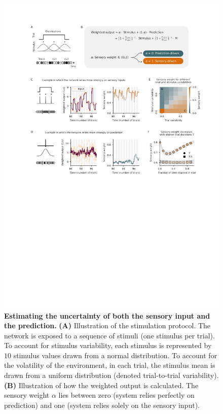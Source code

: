 \documentclass[10pt,a4paper]{article}
\begin{document}
\begin{figure}[t!]
	\centering
    \includegraphics[width=1\linewidth]{../results/figures/final/Fig_3}
\caption{\footnotesize{\bf Estimating the uncertainty of both the sensory input and the prediction.\newline} 
{\bf (A)} Illustration of the stimulation protocol. The network is exposed to a sequence of stimuli (one stimulus per trial). To account for stimulus variability, each stimulus is represented by $10$ stimulus values drawn from a normal distribution. To account for the volatility of the environment, in each trial, the stimulus mean is drawn from a uniform distribution (denoted trial-to-trial variability). 
{\bf (B)} Illustration of how the weighted output is calculated. The sensory weight $\alpha$ lies between zero (system relies perfectly on prediction) and one (system relies solely on the sensory input).
}
\end{figure}
\end{document}
